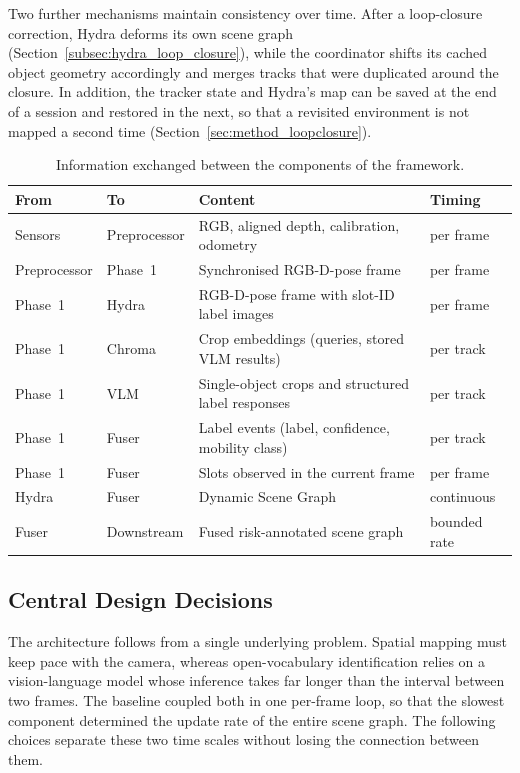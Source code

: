{\small Two further mechanisms maintain consistency over time. After a loop-closure correction, Hydra deforms its own scene graph (Section~\ref{subsec:hydra_loop_closure}), while the coordinator shifts its cached object geometry accordingly and merges tracks that were duplicated around the closure. In addition, the tracker state and Hydra's map can be saved at the end of a session and restored in the next, so that a revisited environment is not mapped a second time (Section~\ref{sec:method_loopclosure}).\par}

\begin{table}[htbp]
	\centering
	\caption{Information exchanged between the components of the framework.}
	\label{tab:method_dataflow}
	\footnotesize
	\setlength{\tabcolsep}{4pt}
	\renewcommand{\arraystretch}{1.05}
	\begin{tabular}{@{}llp{}l@{}}
		\toprule
		From & To & Content & Timing \\
		\midrule
		Sensors & Preprocessor & RGB, aligned depth, calibration, odometry & per frame \\
		Preprocessor & Phase~1 & Synchronised RGB-D-pose frame & per frame \\
		Phase~1 & Hydra & RGB-D-pose frame with slot-ID label images & per frame \\
		Phase~1 & Chroma & Crop embeddings (queries, stored VLM results) & per track \\
		Phase~1 & VLM & Single-object crops and structured label responses & per track \\
		Phase~1 & Fuser & Label events (label, confidence, mobility class) & per track \\
		Phase~1 & Fuser & Slots observed in the current frame & per frame \\
		Hydra & Fuser & Dynamic Scene Graph & continuous \\
		Fuser & Downstream & Fused risk-annotated scene graph & bounded rate \\
		\bottomrule
	\end{tabular}
\end{table}

\subsection{Central Design Decisions}
\label{subsec:method_design_decisions}

{\small The architecture follows from a single underlying problem. Spatial mapping must keep pace with the camera, whereas open-vocabulary identification relies on a vision-language model whose inference takes far longer than the interval between two frames. The baseline coupled both in one per-frame loop, so that the slowest component determined the update rate of the entire scene graph. The following choices separate these two time scales without losing the connection between them.\par}


